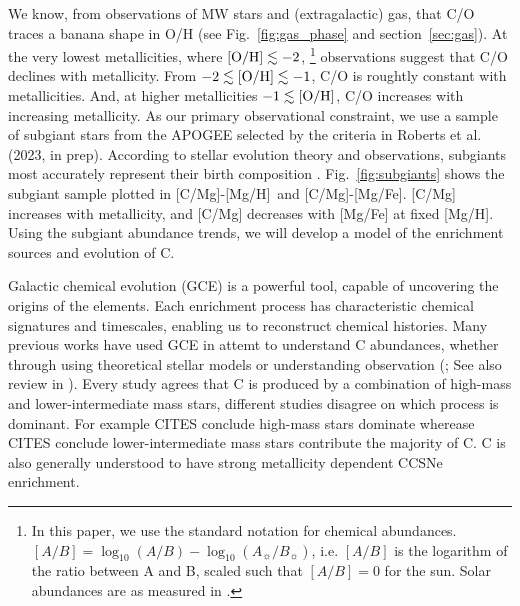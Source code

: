 \documentclass[fleqn,
usenatbib]{mnras}
\newcommand{\apogee}{APOGEE}
\newcommand{\gce}{GCE}
\newcommand{\lims}{lower-intermediate mass stars}
\newcommand{\hms}{high-mass stars}
\newcommand{\caah}{[C/Mg]-[Mg/H]}
\newcommand{\caafe}{[C/Mg]-[Mg/Fe]}
\begin{document}



We know, from observations of MW stars and (extragalactic) gas, that C/O traces a banana shape in O/H (see Fig.~\ref{fig:gas_phase} and section~\ref{sec:gas}). 
At the very lowest metallicities, where $[{\rm O/H}]\lesssim-2$,%
\footnote{In this paper, we use the standard notation for chemical abundances. $[A/B] = \log_{10}\left(A/B\right) - \log_{10}\left(A_{\sun}/B_{\sun}\right)$, i.e. $[A/B]$ is the logarithm of the ratio between A and B, scaled such that $[A/B]=0$ for the sun. Solar abundances are as measured in \citet{asplund+09}.}
%
observations suggest that C/O declines with metallicity.
From $-2 \lesssim {\rm [O/H]}\lesssim -1$, C/O is roughtly constant with metallicities. 
And, at higher metallicities $-1 \lesssim {\rm [O/H]}$, C/O increases with increasing metallicity.
    As our primary observational constraint, we use a sample of subgiant stars from the \apogee{} \citep{apogee17} selected by the criteria in Roberts et al. (2023, in prep).
According to stellar evolution theory and observations, subgiants most accurately represent their birth composition \citep{gilroy89, korn+07, lind+08, souto+18, souto19}.
Fig.~\ref{fig:subgiants} shows the subgiant sample plotted in \caah\ and \caafe{}. [C/Mg] increases with metallicity, and [C/Mg] decreases with [Mg/Fe] at fixed [Mg/H]. 
Using the subgiant abundance trends, we will develop a model of the enrichment sources and evolution of C.




Galactic chemical evolution (\gce) is a powerful tool, capable of uncovering the origins of the elements. 
Each enrichment process has characteristic chemical signatures and timescales, enabling us to reconstruct chemical histories.
Many previous works have used GCE in attemt to understand C abundances, whether through using theoretical stellar models \citep{DTS78, prantzos+18, chiappini+03} 
or understanding  observation (\citealt{tinsley79, HEK00, BF06, rybizki+17, berg+19, KKL20};
See also review in \citealt{romano22}).
%
Every study agrees that C is produced by a combination of high-mass and \lims{}, different studies disagree on which process is dominant. 
For example CITES conclude \hms{} dominate wherease CITES conclude \lims{} contribute the majority of C.
C is also generally understood to have strong metallicity dependent CCSNe enrichment. 
\end{document}
